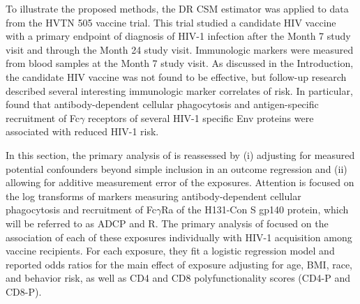 \documentclass[useAMS,usenatbib,referee]{biom}
\newcommand{\RNum}[1]{\uppercase\expandafter{\romannumeral #1\relax}}
\begin{document}
To illustrate the proposed methods, the DR CSM estimator was applied to data from the HVTN 505 vaccine trial. This trial studied a candidate HIV vaccine with a primary endpoint of diagnosis of HIV-1 infection after the Month 7 study visit and through the Month 24 study visit. Immunologic markers were measured from blood samples at the Month 7 study visit. As discussed in the Introduction, the candidate HIV vaccine was not found to be effective, but follow-up research described several interesting immunologic marker correlates of risk. In particular, \citet{neidich2019} found that antibody-dependent cellular phagocytosis and antigen-specific recruitment of Fc$\gamma$ receptors of several HIV-1 specific Env proteins were associated with reduced HIV-1 risk.

In this section, the primary analysis of \citet{neidich2019} is reassessed by (i) adjusting for measured potential confounders beyond simple inclusion in an outcome regression and (ii) allowing for additive measurement error of the exposures. Attention is focused on the log transforms of markers measuring antibody-dependent cellular phagocytosis and recruitment of Fc$\gamma$R\RNum{2}a of the H131-Con S gp140 protein, which will be referred to as ADCP and R\RNum{2}. The primary analysis of \citet{neidich2019} focused on the association of each of these exposures individually with HIV-1 acquisition among vaccine recipients. For each exposure, they fit a logistic regression model and reported odds ratios for the main effect of exposure adjusting for age, BMI, race, and behavior risk, as well as CD4 and CD8 polyfunctionality scores (CD4-P and CD8-P).
\end{document}
